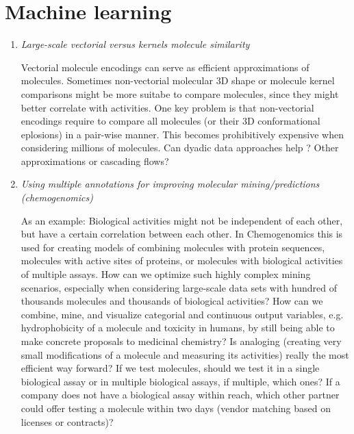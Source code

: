 \documentclass{sig-alternate}
\begin{document}
\section*{Machine learning}
\begin{enumerate}
\item \emph{Large-scale vectorial versus kernels molecule similarity}

Vectorial molecule encodings can serve as efficient approximations of molecules.
Sometimes non-vectorial molecular 3D shape or molecule kernel comparisons might be more suitabe to compare molecules, since
they might better correlate with activities. One key problem is that non-vectorial encodings require to compare all molecules
(or their 3D conformational eplosions) in a pair-wise manner.
This becomes prohibitively expensive when considering millions of molecules.
Can dyadic data approaches help \cite{Hochreiter:2006:SVM:1159508.1159516}? Other approximations or cascading flows?
%
\item \emph{Using multiple annotations for improving molecular mining/predictions (chemogenomics)}

As an example: Biological activities might not be independent of each other, but have a certain correlation between each other.
In Chemogenomics this is used for creating models of combining molecules with protein sequences, molecules with active sites of proteins,
or molecules with biological activities of multiple assays. How can we optimize such highly complex mining scenarios, especially
when considering large-scale data sets with hundred of thousands molecules and thousands of biological activities? 
How can we combine, mine, and visualize categorial and continuous output variables, e.g. hydrophobicity of a molecule and toxicity in humans, 
by still being able to make concrete proposals to medicinal chemistry? Is analoging (creating very small modifications of a molecule and measuring its activities)
really the most efficient way forward? If we test molecules, should we test it in a single biological assay or in multiple biological assays, if multiple, which ones?
If a company does not have a biological assay within reach, which other partner could offer testing a molecule within two days (vendor matching based on licenses or contracts)?
\end{enumerate} 
\end{document}
